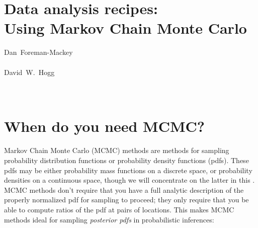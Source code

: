\documentclass[12pt,twoside,pdftex]{article}
\newcommand{\this}{Using Markov Chain Monte Carlo}
\begin{document}
\thispagestyle{plain}\raggedbottom
\section*{Data analysis recipes:\\ \this\footnotemark}


\noindent
Dan~Foreman-Mackey\\
\\[1ex]
David~W.~Hogg\\
\\
\\

\begin{abstract}
Markov Chain Monte Carlo (MCMC) methods for sampling probability
distribution functions, plus abundant computational resources,
have transformed the sciences.
Here we give a fast overview of basic MCMC methods and then turn to
practical advice for their use in real inference problems.
We give advice on method choice, tuning for performance,
initialization and burn-in, judging convergence, and use of the chain
output to produce parameter estimates with associated uncertainties.
[Insert some generally useful point here!]
\end{abstract}

\section{When do you need MCMC?}

Markov Chain Monte Carlo (MCMC) methods are methods for sampling
probability distribution functions or probability density functions (pdfs).
These pdfs may be either probability mass functions on a discrete
space, or probability densities on a continuous space, though we will
concentrate on the latter in this \documentname.
MCMC methods don't require that you have a full analytic description of the
properly normalized pdf for sampling to proceed; they only require
that you be able to compute ratios of the pdf at pairs of locations.
This makes MCMC methods ideal for sampling \emph{posterior
  pdfs} in probabilistic inferences:
\end{document}
